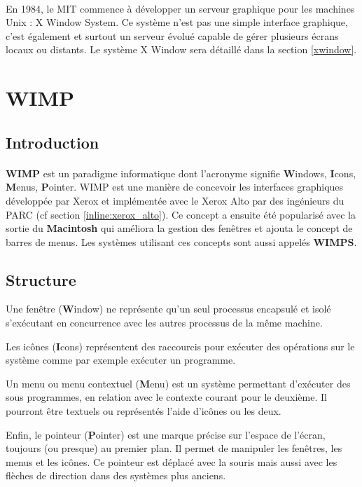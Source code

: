 \paragraph{}
En 1984, le MIT commence à développer un serveur graphique pour les machines Unix : X Window System. Ce système n'est pas une simple interface graphique, c'est également et surtout un serveur évolué capable de gérer plusieurs écrans locaux ou distants. Le système X Window sera détaillé dans la section \ref{xwindow}.

\section{WIMP}

\subsection{Introduction}

\paragraph{}
\textbf{WIMP} est un paradigme informatique dont l'acronyme signifie \textbf{W}indows, \textbf{I}cons, \textbf{M}enus, \textbf{P}ointer. WIMP est une manière de concevoir les interfaces graphiques développée par Xerox et implémentée avec le Xerox Alto par des ingénieurs du PARC (cf section \ref{inline:xerox_alto}). Ce concept a ensuite été popularisé avec la sortie du \textbf{Macintosh} qui améliora la gestion des fenêtres et ajouta le concept de barres de menus. Les systèmes utilisant ces concepts sont aussi appelés \textbf{WIMPS}.

\subsection{Structure}

Une fenêtre (\textbf{W}indow) ne représente qu'un seul processus encapsulé et isolé s'exécutant en concurrence avec les autres processus de la même machine.

Les icônes (\textbf{I}cons) représentent des raccourcis pour exécuter des opérations sur le système comme par exemple exécuter un programme.

Un menu ou menu contextuel (\textbf{M}enu) est un système permettant d'exécuter des sous programmes, en relation avec le contexte courant pour le deuxième. Il pourront être textuels ou représentés l'aide d'icônes ou les deux. 

Enfin, le pointeur (\textbf{P}ointer) est une marque précise sur l'espace de l'écran, toujours (ou presque) au premier plan. Il permet de manipuler les fenêtres, les menus et les icônes. Ce pointeur est déplacé avec la souris mais aussi avec les flèches de direction dans des systèmes plus anciens.